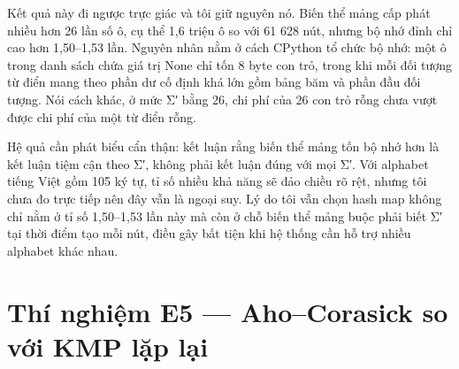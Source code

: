 Kết quả này đi ngược trực giác và tôi giữ nguyên nó. Biến thể mảng cấp
phát nhiều hơn 26 lần số ô, cụ thể 1,6 triệu ô so với 61 628 nút, nhưng
bộ nhớ đỉnh chỉ cao hơn 1,50--1,53 lần. Nguyên nhân nằm ở cách CPython tổ chức
bộ nhớ: một ô trong danh sách chứa giá trị None chỉ tốn 8 byte con trỏ,
trong khi mỗi đối tượng từ điển mang theo phần dư cố định khá lớn gồm
bảng băm và phần đầu đối tượng. Nói cách khác, ở mức
\textbar Σ′\textbar{} bằng 26, chi phí của 26 con trỏ rỗng chưa vượt
được chi phí của một từ điển rỗng.

Hệ quả cần phát biểu cẩn thận: kết luận rằng biến thể mảng tốn bộ nhớ
hơn là kết luận tiệm cận theo \textbar Σ′\textbar, không phải kết luận
đúng với mọi \textbar Σ′\textbar. Với alphabet tiếng Việt gồm 105 ký tự,
tỉ số nhiều khả năng sẽ đảo chiều rõ rệt, nhưng tôi chưa đo trực tiếp
nên đây vẫn là ngoại suy. Lý do tôi vẫn chọn hash map không chỉ nằm ở tỉ số
1,50--1,53 lần này mà còn ở chỗ biến thể mảng buộc phải biết
\textbar Σ′\textbar{} tại thời điểm tạo mỗi nút, điều gây bất tiện khi
hệ thống cần hỗ trợ nhiều alphabet khác nhau.

\section{Thí nghiệm E5 --- Aho--Corasick so với KMP lặp lại}
\label{sec:6-8}

\begin{center}
\end{center}

